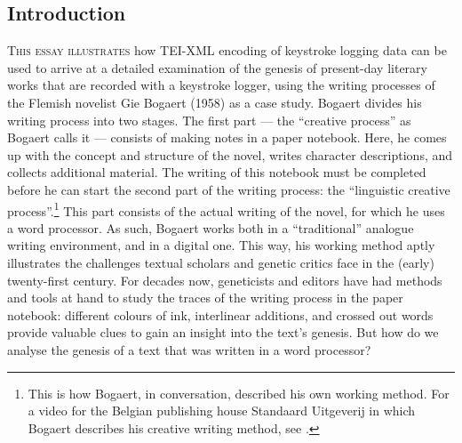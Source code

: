 \begin{paper}
\section{Introduction}
\textsc{This essay illustrates} how TEI-XML encoding of keystroke logging data can be used to arrive at a detailed examination of
the genesis of present-day literary works that are recorded with a keystroke
logger, using the writing processes of the Flemish novelist
Gie Bogaert (1958) as a case study. Bogaert divides his writing process into two stages.
The first part --- the ``creative process'' as Bogaert calls it --- consists
of making notes in a paper notebook. Here, he comes up with the concept and structure of the novel, writes character descriptions, and collects
additional material. The writing of this notebook must be completed
before he can start the second part of the writing process: the
``linguistic creative process''.\footnote{This is how Bogaert, in
  conversation, described his own working method. For a video for the
  Belgian publishing house Standaard Uitgeverij in which Bogaert
  describes his creative writing method, see \citealt{bogaert_gie_2013}.}
This part consists of the actual writing of the novel, for which he uses a word processor. As such, Bogaert works both in a ``traditional'' analogue writing
environment, and in a digital one. This way, his working method aptly
illustrates the challenges textual scholars and genetic critics face
in the (early) twenty-first century. For decades now, geneticists and
editors have had methods and tools at hand to study the traces of the
writing process in the paper notebook: different colours of ink,
interlinear additions, and crossed out words provide valuable clues to gain an insight into the text's
genesis. But how do we analyse the genesis of a text that was written in
a word processor?


\end{paper}
